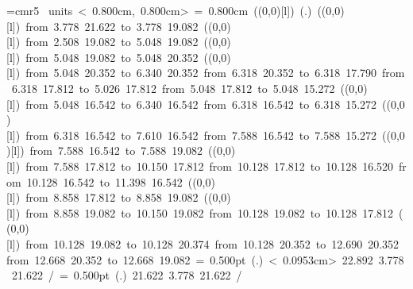 \font\thinlinefont=cmr5
\mbox{\beginpicture
\setcoordinatesystem units < 0.800cm, 0.800cm>
\unitlength= 0.800cm
\linethickness=1pt
\setplotsymbol ({\makebox(0,0)[l]{\tencirc{}}})
\setshadesymbol ({\thinlinefont .})
\setlinear
%
%
\linethickness=1pt
\setplotsymbol ({\makebox(0,0)[l]{\tencirc{}}})
\putrule from  3.778 21.622 to  3.778 19.082
%
%
\linethickness=1pt
\setplotsymbol ({\makebox(0,0)[l]{\tencirc{}}})
\putrule from  2.508 19.082 to  5.048 19.082
%
%
\linethickness=1pt
\setplotsymbol ({\makebox(0,0)[l]{\tencirc{}}})
\putrule from  5.048 19.082 to  5.048 20.352
%
%
\linethickness=1pt
\setplotsymbol ({\makebox(0,0)[l]{\tencirc{}}})
\putrule from  5.048 20.352 to  6.340 20.352
\putrule from  6.318 20.352 to  6.318 17.790
\putrule from  6.318 17.812 to  5.026 17.812
\putrule from  5.048 17.812 to  5.048 15.272
%
%
\linethickness=1pt
\setplotsymbol ({\makebox(0,0)[l]{\tencirc{}}})
\putrule from  5.048 16.542 to  6.340 16.542
\putrule from  6.318 16.542 to  6.318 15.272
%
%
\linethickness=1pt
\setplotsymbol ({\makebox(0,0)[l]{\tencirc{}}})
\putrule from  6.318 16.542 to  7.610 16.542
\putrule from  7.588 16.542 to  7.588 15.272
%
%
\linethickness=1pt
\setplotsymbol ({\makebox(0,0)[l]{\tencirc{}}})
\putrule from  7.588 16.542 to  7.588 19.082
%
%
\linethickness=1pt
\setplotsymbol ({\makebox(0,0)[l]{\tencirc{}}})
\putrule from  7.588 17.812 to 10.150 17.812
\putrule from 10.128 17.812 to 10.128 16.520
\putrule from 10.128 16.542 to 11.398 16.542
%
%
\linethickness=1pt
\setplotsymbol ({\makebox(0,0)[l]{\tencirc{}}})
\putrule from  8.858 17.812 to  8.858 19.082
%
%
\linethickness=1pt
\setplotsymbol ({\makebox(0,0)[l]{\tencirc{}}})
\putrule from  8.858 19.082 to 10.150 19.082
\putrule from 10.128 19.082 to 10.128 17.812
%
%
\linethickness=1pt
\setplotsymbol ({\makebox(0,0)[l]{\tencirc{}}})
\putrule from 10.128 19.082 to 10.128 20.374
\putrule from 10.128 20.352 to 12.690 20.352
\putrule from 12.668 20.352 to 12.668 19.082
%
%
\linethickness= 0.500pt
\setplotsymbol ({\thinlinefont .})
\setdots < 0.0953cm>
 22.892  3.778 21.622 /
%
%
\linethickness= 0.500pt
\setplotsymbol ({\thinlinefont .})
 21.622  3.778 21.622 /
%
}
